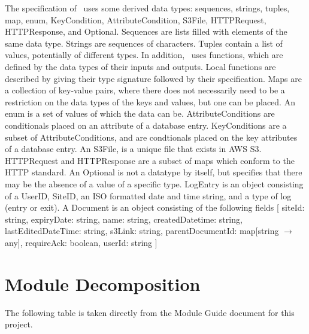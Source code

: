 \documentclass[12pt, titlepage]{article}
\begin{document}
\noindent
The specification of \progname \ uses some derived data types:
sequences, strings, tuples, map, enum, KeyCondition,
AttributeCondition, S3File, HTTPRequest, HTTPResponse, and Optional. Sequences
are lists filled with elements of the same data type. Strings
are sequences of characters. Tuples contain a list of values, potentially of
different types. In addition, \progname \ uses functions, which
are defined by the data types of their inputs and outputs. Local functions are
described by giving their type signature followed by their specification. Maps
are a collection of key-value pairs, where there does not necessarily need to
be a restriction on the data types of the keys and values, but one can be
placed. An enum is a set of values of which the data can be.
AttributeConditions are conditionals placed on an attribute of a
database entry. KeyConditions are a subset of AttributeConditions,
and are condtionals placed on the key attributes of a database entry.
An S3File, is a unique file that exists in AWS S3. HTTPRequest and HTTPResponse
are a subset of maps which conform to the HTTP standard. An Optional is not a
datatype by itself, but specifies that there may be the absence of a value of a
specific type. LogEntry is an object consisting of a UserID, SiteID, an ISO
formatted date and time string, and a type of log (entry or exit). A
Document is an object
consisting of the following fields [ siteId: string, expiryDate: string, name:
  string, createdDatetime: string, lastEditedDateTime: string, s3Link: string,
  parentDocumentId: map[string $\rightarrow$ any], requireAck: boolean, userId:
string ]

\section{Module Decomposition}

The following table is taken directly from the Module Guide document
for this project.
\end{document}
